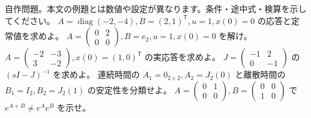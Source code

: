 \documentclass[11pt]{article}
\begin{document}
自作問題。本文の例題とは数値や設定が異なります。条件・途中式・検算を示してください。
\problem[入力応答]
$A=\operatorname{diag}(-2,-4),B=(2,1)^{\mathsf T},u=1,x(0)=0$ の応答と定常値を求めよ。
\workspace{45mm}
\problem[特異な状態行列]
$A=\begin{pmatrix}0&2\\0&0\end{pmatrix},B=e_2,u=1,x(0)=0$ を解け。
\workspace{45mm}
\newpage
\problem[減衰する回転]
$A=\begin{pmatrix}-2&-3\\3&-2\end{pmatrix},x(0)=(1,0)^{\mathsf T}$ の実応答を求めよ。
\workspace{45mm}
\problem[レゾルベント]
$J=\begin{pmatrix}-1&2\\0&-1\end{pmatrix}$ の $(sI-J)^{-1}$ を求めよ。
\workspace{45mm}
\newpage
\problem[境界の安定性]
連続時間の $A_1=0_{2\times2},A_2=J_2(0)$ と離散時間の $B_1=I_2,B_2=J_2(1)$ の安定性を分類せよ。
\workspace{45mm}
\problem[可換性の反例]
$A=\begin{pmatrix}0&1\\0&0\end{pmatrix},B=\begin{pmatrix}0&0\\1&0\end{pmatrix}$ で $e^{A+B}\ne e^Ae^B$ を示せ。
\workspace{45mm}
\end{document}
